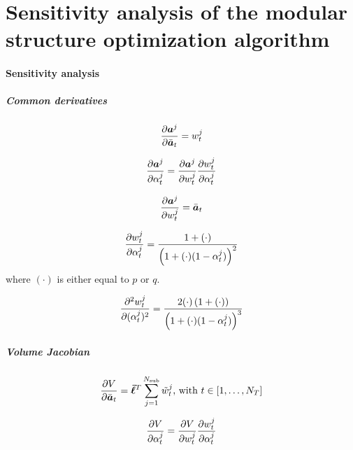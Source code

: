 \chapter{Sensitivity analysis of the modular structure optimization algorithm} \label{app:01}
\subsubsection{Sensitivity analysis}
\paragraph*{Common derivatives}

\begin{equation}
    \frac{\partial\bm{a}^j}{\partial\bar{\bm{a}}_t} = w_t^j
\end{equation}


\begin{equation}
    \frac{\partial\bm{a}^j}{\partial\alpha_t^j} =  \frac{\partial\bm{a}^j}{\partial w_t^j} \frac{\partial w_t^j}{\partial\alpha_t^j}
\end{equation}

\begin{equation}
    \frac{\partial\bm{a}^j}{\partial w_t^j} = \bar{\bm{a}}_t
\end{equation}

\begin{equation}
    \frac{\partial w_t^j}{\partial\alpha_t^j} = \frac{1+(\cdot)}{\left(1+(\cdot)(1-\alpha_t^j)\right)^2}
\end{equation}
where $(\cdot)$ is either equal to $p$ or $q$.

\begin{equation}
    \frac{\partial^2w_t^j}{\partial(\alpha_t^j)^2} = \frac{2(\cdot)\left(1+(\cdot)\right)}{\left(1+(\cdot)(1-\alpha_t^j)\right)^3}
\end{equation}

\paragraph*{Volume Jacobian}
\begin{equation}
    \frac{\partial V}{\partial{\bar{\bm{a}}_t}} = \bm{\bar{\ell}}^T\sum_{j=1}^{N_{\text{sub}}} \tilde{w}_t^j  \text{, with } t \in [1,\dots,N_T]
\end{equation}

\begin{equation}
    \frac{\partial V}{\partial\alpha_t^j}= \frac{\partial V}{\partial w_t^j} \frac{\partial w_t^j}{\partial\alpha_t^j}
\end{equation}

